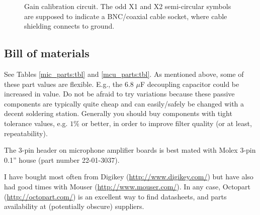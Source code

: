 \documentclass[letterpaper]{article}
\begin{document}
\begin{figure}
\caption[Gain calibration circuit]{Gain calibration circuit. The odd
  X1 and X2 semi-circular symbols are supposed to indicate a
  BNC/coaxial cable socket, where cable shielding connects to ground.}
\label{gaincal_schem:fig}
\end{figure}


\subsection{Bill of materials} %

See Tables \ref{mic_parts:tbl} and \ref{mcu_parts:tbl}.  As mentioned
above, some of these part values are flexible. E.g., the 6.8 $\mu$F
decoupling capacitor could be increased in value. Do not be afraid to
try variations because these passive components are typically quite
cheap and can easily/safely be changed with a decent soldering
station. Generally you should buy components with tight tolerance
values, e.g. $1\%$ or better, in order to improve filter quality (or at
least, repeatability).

The 3-pin header on microphone amplifier boards is best mated with
Molex 3-pin 0.1'' house (part number 22-01-3037).

I have bought most often from Digikey (\url{http://www.digikey.com/})
but have also had good times with Mouser
(\url{http://www.mouser.com/}). In any case, Octopart
(\url{http://octopart.com/}) is an excellent way to find datasheets,
and parts availability at (potentially obscure) suppliers.
\end{document}
